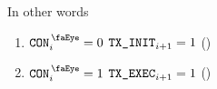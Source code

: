 In other words
\begin{enumerate}
        \item \If $\peekContext _{i} = 0$ \Then $\texttt{TX}\texttt{\_INIT} _{i + 1} = 1$ \quad (\trash)
        \item \If $\peekContext _{i} = 1$ \Then $\texttt{TX}\texttt{\_EXEC} _{i + 1} = 1$ \quad (\trash)
\end{enumerate}
